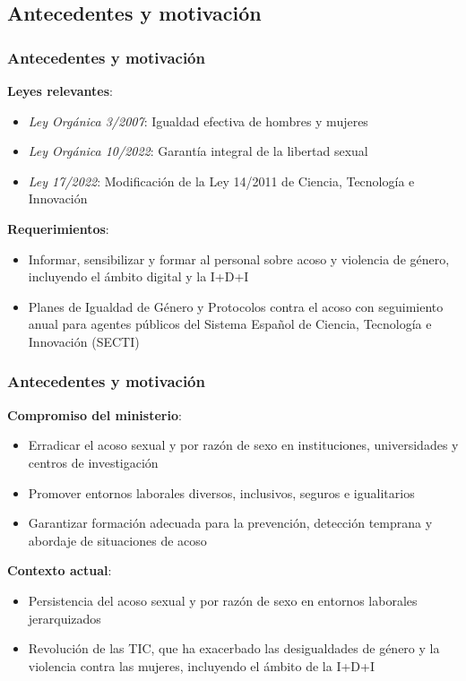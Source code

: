 \documentclass{beamer}
\begin{document}
    \subsection{Antecedentes y motivación}
    \begin{frame}
        \frametitle{Antecedentes y motivación}
        \textbf{Leyes relevantes}:
        \begin{itemize}
            \item \textit{Ley Orgánica 3/2007}: Igualdad efectiva de hombres y mujeres
            \item \textit{Ley Orgánica 10/2022}: Garantía integral de la libertad sexual
            \item \textit{Ley 17/2022}: Modificación de la Ley 14/2011 de Ciencia, Tecnología e Innovación
        \end{itemize}
        \textbf{Requerimientos}:
        \begin{itemize}
            \item Informar, sensibilizar y formar al personal sobre acoso y violencia de género, incluyendo el ámbito digital y la I+D+I
            \item Planes de Igualdad de Género y Protocolos contra el acoso con seguimiento anual para agentes públicos del Sistema Español de Ciencia, Tecnología e Innovación (SECTI)
        \end{itemize}
    \end{frame}

    \begin{frame}
        \frametitle{Antecedentes y motivación}
        \textbf{Compromiso del ministerio}:
        \begin{itemize}
            \item Erradicar el acoso sexual y por razón de sexo en instituciones, universidades y centros de investigación
            \item Promover entornos laborales diversos, inclusivos, seguros e igualitarios
            \item Garantizar formación adecuada para la prevención, detección temprana y abordaje de situaciones de acoso
        \end{itemize}
        \textbf{Contexto actual}:
        \begin{itemize}
            \item Persistencia del acoso sexual y por razón de sexo en entornos laborales jerarquizados
            \item Revolución de las TIC, que ha exacerbado las desigualdades de género y la violencia contra las mujeres, incluyendo el ámbito de la I+D+I
        \end{itemize}
    \end{frame}
\end{document}

